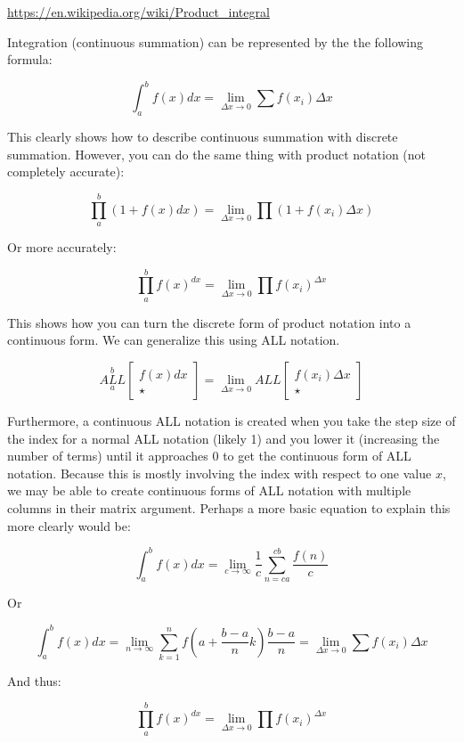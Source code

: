 \documentclass{article}
\begin{document}
\url{https://en.wikipedia.org/wiki/Product_integral}

Integration (continuous summation) can be represented by the the following formula:

$$\int_a^b f(x) dx = \underset{\Delta x \rightarrow 0}{\lim} \sum f(x_i) \Delta x$$

This clearly shows how to describe continuous summation with discrete summation. However, you can do the same thing with product notation (not completely accurate):

$$\prod_a^b(1+f(x) dx) =  \underset{\Delta x \rightarrow 0}{\lim} \prod (1 + f(x_i) \Delta x)$$

Or more accurately:

$$\prod_a^bf(x)^{dx} =  \underset{\Delta x \rightarrow 0}{\lim} \prod f(x_i)^{\Delta x}$$

This shows how you can turn the discrete form of product notation into a continuous form. We can generalize this using ALL notation.

$$\underset{a}{\overset{b}{ALL}} \begin{bmatrix}
f(x)dx \\
\star
\end{bmatrix}=\underset{\Delta x \rightarrow 0}{\lim} ALL \begin{bmatrix}
f(x_i)\Delta x \\
\star
\end{bmatrix}$$

Furthermore, a continuous ALL notation is created when you take the step size of the index for a normal ALL notation (likely 1) and you lower it (increasing the number of terms) until it approaches 0 to get the continuous form of ALL notation. Because this is mostly involving the index with respect to one value $x$, we may be able to create continuous forms of ALL notation with multiple columns in their matrix argument. Perhaps a more basic equation to explain this more clearly would be:

$$\int_a^b f(x) dx = \underset{c \rightarrow \infty}{\lim} \frac{1}{c} \sum_{n=ca}^{cb} \frac{f(n)}{c}$$

Or

$$\int_a^b f(x) dx = \underset{n \rightarrow \infty}{\lim} \sum_{k=1}^{n} f(a+\frac{b-a}{n}k)\frac{b-a}{n}=\underset{\Delta x \rightarrow 0}{\lim} \sum f(x_i) \Delta x$$

And thus:

$$\prod_a^bf(x)^{dx} =  \underset{\Delta x \rightarrow 0}{\lim} \prod f(x_i)^{\Delta x}$$
\end{document}
